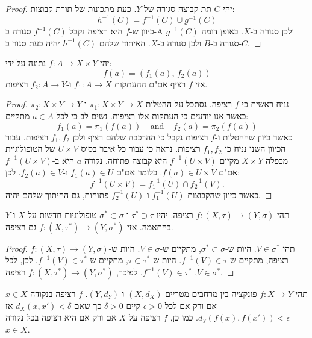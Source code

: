 \documentclass{tstextbook}
\begin{document}
\begin{proof}
יהי \(C\) תת קבוצה סגורה של \(Y\). כעת מתכונות של תורת קבוצות:
$$h^{-1}(C)=f^{-1}(C)\cup g^{-1}(C)$$
כיוון ש-\(f\) היא רציפה נקבל \(f^{-1}(C)\) סגורה ב-A ולכן סגורה ב-\(X\). באופן דומה \(g^{-1}(C)\) סגורה ב-\(B\) ולכן סגורה ב-\(X\). האיחוד שלהם \(h^{-1}(C)\) יהיה כעת סגור ב-\(C\).

\end{proof}
\begin{proposition}
יהי \(f:A\to X\times Y\) נתונה על ידי:
$$f(a)=(f_{1}(a),\,f_{2}(a))$$
אזי \(f\) רציף אם"ם ההעתקות \(f_{1}:A\to X\) ו-\(f_{2}:A\to Y\) רציפות.

\end{proposition}
\begin{proof}
נניח ראשית כי \(f\) רציפה. נסתכל על ההטלות \(\pi_{1}:X\times Y\to X\) ו-\(\pi_{2}:X\times Y\to Y\) כאשר אנו יודעים כי העתקות אלו רציפות. נשים לב כי לכל \(a \in A\) מתקיים:
$$f_{1}(a)=\pi_{1}(f(a))\ \ \ \ \ \mathrm{and}\ \ \ \ \ f_{2}(a)=\pi_{2}(f(a))$$
כאשר כיוון שההטלות ו-\(f\) רציפות נקבל כי ההרכבה שלהם רציף ולכן \(f_{1},f_{2}\) רציפות.
עבור הכיוון השני נניח כי \(f_{1},f_{2}\) רציפות. נראה כי עבור כל איבר בסיס \(U\times V\) של הטופולוגיית מכפלה \(X \times Y\) מקיים \(f^{-1}(U\times V)\) היא קבוצה פתוחה. נקודה \(a\) היא ב-\(f^{-1}(U\times V)\) אם"ם \(f(a)\in U \times V\). כלומר אם"ם \(f_{1}(a) \in U\) ו-\(f_{2}(a)\in V\). לכן:
$$f^{-1}(U\times V)=f_{1}^{-1}(U)\cap f_{2}^{-1}(V).$$
כאשר כיוון שהקבוצות \(f_{1}^{-1}(U)\) ו-\(f_{2}^{-1}(U)\) פתוחות, גם החיתוך שלהם יהיה.

\end{proof}
\begin{proposition}
תהי \(f: (X, \tau) \to (Y, \sigma)\) רציפה. יהיו \(\tau^* \supset \tau\) ו-\(\sigma^* \subset \sigma\) טופולוגיות חדשות על \(X\) ו-\(Y\) בהתאמה. אזי \(f: (X, \tau^*) \to (Y, \sigma^*)\) גם רציפה.

\end{proposition}
\begin{proof}
תהי \(V \in \sigma^*\). היות ש-\(\sigma^* \subset \sigma\), מתקיים ש-\(V \in \sigma\). היות ש-\(f: (X, \tau) \to (Y, \sigma)\) רציפה, מתקיים ש-\(f^{-1}(V) \in \tau\). היות ש-\(\tau \subset \tau^*\), מתקיים ש-\(f^{-1}(V) \in \tau^*\). לכן, לכל \(V \in \sigma^*\), \(f^{-1}(V) \in \tau^*\). לפיכך, \(f: (X, \tau^*) \to (Y, \sigma^*)\) רציפה.

\end{proof}
\begin{proposition}
תהי \(f: X \to Y\) פונקציה בין מרחבים מטריים \((X, d_X)\) ו-\((Y, d_Y)\). \(f\) רציפה בנקודה \(x \in X\) אם ורק אם לכל \(\epsilon > 0\) קיים \(\delta > 0\) כך שאם \(d_X(x, x') < \delta\) אז \(d_Y(f(x), f(x')) < \epsilon\). כמו כן, \(f\) רציפה על \(X\) אם ורק אם היא רציפה בכל נקודה \(x \in X\).

\end{proposition}
\end{document}
